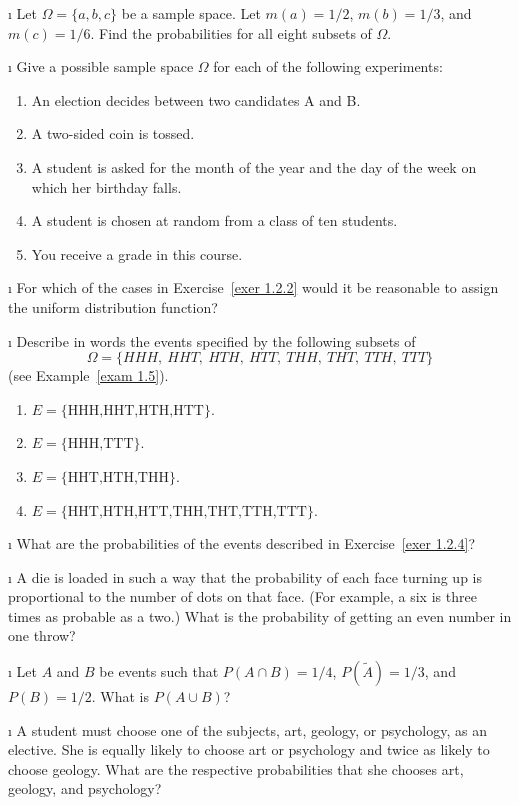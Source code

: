 \exercises
\begin{LJSItem}

\i\label{exer1.2.1} Let $\Omega = \{a,b,c\}$ be a sample space.  Let $m(a)
= 1/2$, $m(b) =
1/3$, and $m(c) = 1/6$.  Find the probabilities for all eight subsets of
$\Omega$.

\i\label{exer 1.2.2} Give a possible sample space $\Omega$ for each of
the following experiments:
\begin{enumerate}
\item An election decides between two candidates A and B.
\item A two-sided coin is tossed.
\item A student is asked for the month of the year and the day of the week
on which her birthday falls.
\item A student is chosen at random from a class of ten students.
\item You receive a grade in this course.
\end{enumerate}

\i\label{exer 1.2.3} For which of the cases in Exercise~\ref{exer 1.2.2}  
would it be reasonable to assign the uniform distribution function?

\i\label{exer 1.2.4} Describe in words the events specified by
the following subsets of 
$$\Omega = \{HHH,\ HHT,\ HTH,\ HTT,\ THH,\ THT,\ TTH,\ TTT\}$$
(see Example~\ref{exam 1.5}).
\begin{enumerate}
\item $E = \{\mbox{HHH,HHT,HTH,HTT}\}$. 
\item $E = \{\mbox{HHH,TTT}\}$.
\item $E = \{\mbox{HHT,HTH,THH}\}$. 
\item $E =
\{\mbox{HHT,HTH,HTT,THH,THT,TTH,TTT}\}$.
\end{enumerate}

\i\label{exer 1.2.5} What are the probabilities of the events described in
Exercise~\ref{exer 1.2.4}?

\i\label{exer 1.2.6} A die is loaded in such a way that the probability of
each face turning
up is proportional to the number of dots on that face.  (For example, a six
is
three times as probable as a two.)  What is the probability of getting an
even
number in one throw?

\i\label{exer 1.2.7} Let $A$ and $B$ be events such that $P(A \cap B) =
1/4$, $P(\tilde A) =
1/3$, and $P(B) = 1/2$.  What is $P(A \cup B)$?

\i\label{exer 1.2.8} A student must choose one of the subjects, art,
geology, or psychology,
as an elective.  She is equally likely to choose art or psychology and twice
as
likely to choose geology.  What are the respective probabilities that she
chooses art, geology, and psychology?


\end{LJSItem}
